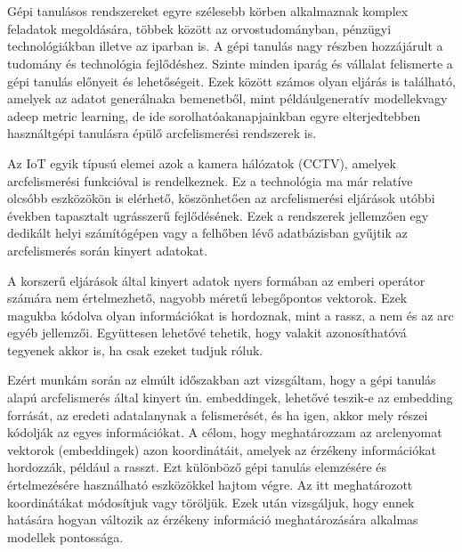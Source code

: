\section{\bevezetes}

Gépi tanulásos rendszereket egyre szélesebb körben alkalmaznak komplex feladatok megoldására, többek között az orvostudományban, pénzügyi technológiákban illetve az iparban is. A gépi tanulás nagy részben hozzájárult a tudomány és technológia fejlődéshez. Szinte minden iparág és vállalat felismerte a gépi tanulás előnyeit és lehetőségeit. Ezek között számos olyan eljárás is található, amelyek az adatot generálnaka bemenetből, mint példáulgeneratív modellekvagy adeep metric learning, de ide sorolhatóakanapjainkban egyre elterjedtebben használtgépi tanulásra épülő arcfelismerési rendszerek is.

Az IoT egyik típusú elemei azok a kamera hálózatok (CCTV), amelyek arcfelismerési funkcióval is rendelkeznek. Ez a technológia ma már relatíve olcsóbb eszközökön is elérhető, köszönhetően az arcfelismerési eljárások utóbbi években tapasztalt ugrásszerű fejlődésének. Ezek a rendszerek jellemzően egy dedikált helyi számítógépen vagy a felhőben lévő adatbázisban gyűjtik az arcfelismerés során kinyert adatokat.

A korszerű eljárások által kinyert adatok nyers formában az emberi operátor számára nem értelmezhető, nagyobb méretű lebegőpontos vektorok. Ezek magukba kódolva olyan információkat is hordoznak, mint a rassz, a nem és az arc egyéb jellemzői.  Együttesen lehetővé tehetik, hogy valakit azonosíthatóvá tegyenek akkor is, ha csak ezeket tudjuk róluk. 

Ezért munkám során az elmúlt időszakban azt vizsgáltam, hogy a gépi tanulás alapú arcfelismerés által kinyert ún. embeddingek, lehetővé teszik-e az embedding forrását, az eredeti adatalanynak a felismerését, és ha igen, akkor mely részei kódolják az egyes információkat. A célom, hogy meghatározzam az arclenyomat vektorok (embeddingek) azon koordinátáit, amelyek az érzékeny információkat hordozzák, például a rasszt. Ezt különböző gépi tanulás elemzésére és értelmezésére használható eszközökkel hajtom végre. Az itt meghatározott koordinátákat módosítjuk vagy töröljük. Ezek után vizsgáljuk, hogy ennek hatására hogyan változik az érzékeny információ meghatározására alkalmas modellek pontossága.

